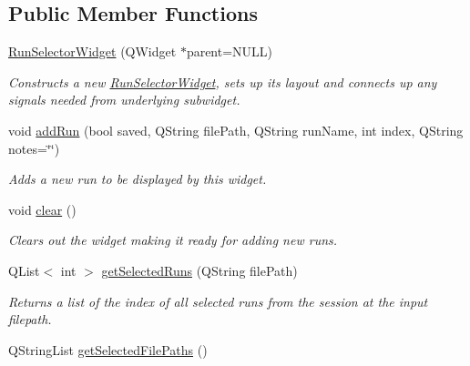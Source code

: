\subsection*{Public Member Functions}
\begin{DoxyCompactItemize}
\item 
\hypertarget{class_picto_1_1_run_selector_widget_ae46d2c142e757d370d12bb6ab7ade6d8}{\hyperlink{class_picto_1_1_run_selector_widget_ae46d2c142e757d370d12bb6ab7ade6d8}{Run\-Selector\-Widget} (Q\-Widget $\ast$parent=N\-U\-L\-L)}\label{class_picto_1_1_run_selector_widget_ae46d2c142e757d370d12bb6ab7ade6d8}

\begin{DoxyCompactList}\small\item\em Constructs a new \hyperlink{class_picto_1_1_run_selector_widget}{Run\-Selector\-Widget}, sets up its layout and connects up any signals needed from underlying subwidget. \end{DoxyCompactList}\item 
void \hyperlink{class_picto_1_1_run_selector_widget_af0ec232c8ba5084032d9a5cc816223ea}{add\-Run} (bool saved, Q\-String file\-Path, Q\-String run\-Name, int index, Q\-String notes=\char`\"{}\char`\"{})
\begin{DoxyCompactList}\small\item\em Adds a new run to be displayed by this widget. \end{DoxyCompactList}\item 
void \hyperlink{class_picto_1_1_run_selector_widget_aabf50e23078d4a972b63b01d1b66b359}{clear} ()
\begin{DoxyCompactList}\small\item\em Clears out the widget making it ready for adding new runs. \end{DoxyCompactList}\item 
Q\-List$<$ int $>$ \hyperlink{class_picto_1_1_run_selector_widget_aaa8edb495220c3474ddb50a779dd9a7b}{get\-Selected\-Runs} (Q\-String file\-Path)
\begin{DoxyCompactList}\small\item\em Returns a list of the index of all selected runs from the session at the input filepath. \end{DoxyCompactList}\item 
\hypertarget{class_picto_1_1_run_selector_widget_a0f13db4de2d89a0f0946739c83b4946a}{Q\-String\-List \hyperlink{class_picto_1_1_run_selector_widget_a0f13db4de2d89a0f0946739c83b4946a}{get\-Selected\-File\-Paths} ()}\label{class_picto_1_1_run_selector_widget_a0f13db4de2d89a0f0946739c83b4946a}


\end{DoxyCompactItemize}
